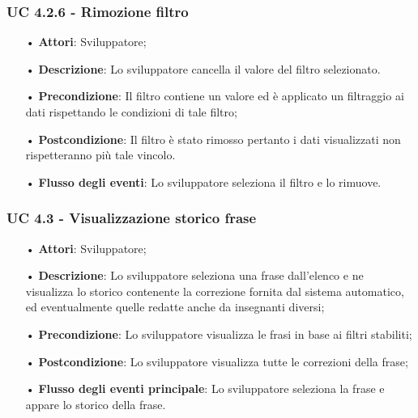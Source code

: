 \subsubsection{UC 4.2.6 - Rimozione filtro}
\begin{itemize}
\item[•]\textbf{Attori}: Sviluppatore;
\item[•]\textbf{Descrizione}: Lo sviluppatore cancella il valore del filtro selezionato.
\item[•]\textbf{Precondizione}: Il filtro contiene un valore ed è applicato un filtraggio ai dati rispettando le condizioni di tale filtro;
\item[•]\textbf{Postcondizione}: Il filtro è stato rimosso pertanto i dati visualizzati non rispetteranno più tale vincolo.
\item[•]\textbf{Flusso degli eventi}: Lo sviluppatore seleziona il filtro e lo rimuove.
 \end{itemize}
  
\subsubsection{UC 4.3 - Visualizzazione storico frase}
\begin{itemize}
\item[•]\textbf{Attori}: Sviluppatore;
\item[•]\textbf{Descrizione}: Lo sviluppatore seleziona una frase dall'elenco e ne visualizza lo storico contenente la correzione fornita dal sistema automatico, ed eventualmente quelle redatte anche da insegnanti diversi;
\item[•]\textbf{Precondizione}:  Lo sviluppatore visualizza le frasi in base ai filtri stabiliti;
\item[•]\textbf{Postcondizione}: Lo sviluppatore visualizza tutte le correzioni della frase;
\item[•]\textbf{Flusso degli eventi principale}: Lo sviluppatore seleziona la frase e appare lo storico della frase.
\end{itemize}

